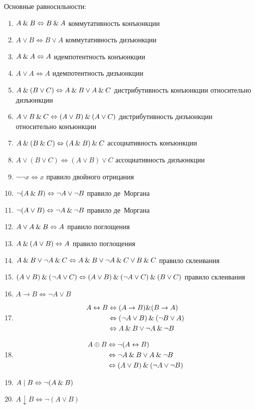 \documentclass[main]{subfiles}
\begin{document}
Основные равносильности:
\begin{enumerate}
    \item $A\mathbin{\&} B \Leftrightarrow B\mathbin{\&} A$ коммутативность конъюнкции
    \item $A\lor B \Leftrightarrow B\lor A$ коммутативность дизъюнкции
    \item $A\mathbin{\&} A \Leftrightarrow A$ идемпотентность конъюнкции
    \item $A\lor A \Leftrightarrow  A$ идемпотентность дизъюнкции
    \item $A\mathbin{\&}(B\lor C) \Leftrightarrow  A\mathbin{\&} B \lor A\mathbin{\&} C$ дистрибутивность конъюнкции относительно дизъюнкции
    \item $A\lor B\mathbin{\&} C  \Leftrightarrow (A\lor B)\mathbin{\&} (A\lor C)$ дистрибутивность дизъюнкции относительно конъюнкции
    \item $A\mathbin{\&} (B\mathbin{\&} C) \Leftrightarrow (A\mathbin{\&} B)\mathbin{\&} C$ ассоциативность конъюнкции
    \item $A\lor (B\lor C) \Leftrightarrow  (A\lor B)\lor C$ ассоциативность дизъюнкции
    \item $\lnot\lnot x \Leftrightarrow x$ правило двойного отрицания
    \item $\lnot(A\mathbin{\&} B) \Leftrightarrow \lnot A \lor \lnot B$ правило де~Моргана
    \item $\lnot(A\lor B) \Leftrightarrow  \lnot A \mathbin{\&} \lnot B$ правило де~Моргана
    \item $A\lor A \mathbin{\&} B \Leftrightarrow  A$ правило поглощения
    \item $A\mathbin{\&}(A\lor B) \Leftrightarrow  A$ правило поглощения
    \item $A\mathbin{\&} B \lor \lnot A\mathbin{\&} C \Leftrightarrow  A\mathbin{\&} B \lor \lnot A \mathbin{\&} C \lor B\mathbin{\&} C $ правило склеивания
    \item $(A\lor B) \mathbin{\&} (\lnot A \lor C) \Leftrightarrow  (A\lor B) \mathbin{\&} (\lnot A \lor C) \mathbin{\&} (B\lor C)$ правило склеивания
    \item $A\to B \Leftrightarrow \lnot A \lor B$
    \item
          \begin{align*}
              A\leftrightarrow B & \Leftrightarrow (A\to B) \& (B\to A)                  \\
                                 & \Leftrightarrow (\lnot A\lor B) \mathbin{\&} (\lnot B \lor A) \\
                                 & \Leftrightarrow A\mathbin{\&} B \lor \lnot A \mathbin{\&} \lnot B
          \end{align*}
    \item
          \begin{align*}
              A\oplus B & \Leftrightarrow \lnot(A \leftrightarrow B)            \\
                        & \Leftrightarrow \lnot A\mathbin{\&} B \lor A \mathbin{\&} \lnot B     \\
                        & \Leftrightarrow (A\lor B) \mathbin{\&} (\lnot A \lor \lnot B)
          \end{align*}
    \item $A \mid B \Leftrightarrow  \lnot(A \mathbin{\&} B)$
    \item $A \downarrow B \Leftrightarrow \lnot (A\lor B)$
\end{enumerate}
\end{document}
